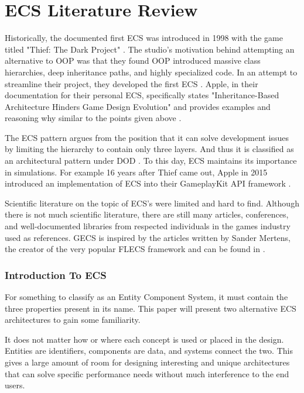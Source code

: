 \section{ECS Literature Review}
\label{chap:1}

Historically, the documented first ECS was introduced in 1998 with the game titled "Thief: The Dark Project" \cite{RomeoPHD}. The studio's motivation behind attempting an alternative to OOP was that they found OOP introduced massive class hierarchies, deep inheritance paths, and highly specialized code. In an attempt to streamline their project, they developed the first ECS \cite{Haerkoenen2019}. Apple, in their documentation for their personal ECS, specifically states "Inheritance-Based Architecture Hinders Game Design Evolution" and provides examples and reasoning why similar to the points given above \cite{AppleECSBad}.

The ECS pattern argues from the position that it can solve development issues by limiting the hierarchy to contain only three layers. And thus it is classified as an architectural pattern under DOD \cite{RomeoPHD}. To this day, ECS maintains its importance in simulations. For example 16 years after Thief came out, Apple in 2015 introduced an implementation of ECS into their GameplayKit API framework \cite{AppleECS}.

Scientific literature on the topic of ECS's were limited and hard to find. Although there is not much scientific literature, there are still many articles, conferences, and well-documented libraries from respected individuals in the games industry used as references. GECS is inspired by the articles written by Sander Mertens, the creator of the very popular FLECS framework and can be found in \cite{SanderMertensECS}. 

\subsubsection{Introduction To ECS}
For something to classify as an Entity Component System, it must contain the three properties present in its name. This paper will present two alternative ECS architectures to gain some familiarity. 

It does not matter how or where each concept is used or placed in the design. Entities are identifiers, components are data, and systems connect the two. This gives a large amount of room for designing interesting and unique architectures that can solve specific performance needs without much interference to the end users. 

